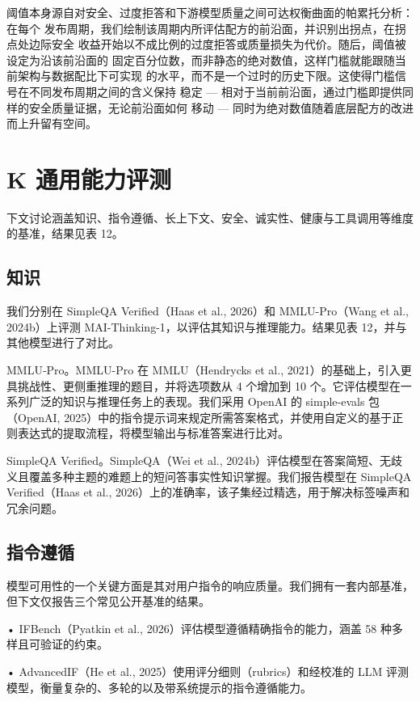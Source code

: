 \documentclass[
  10
]{article}
\begin{document}
阈值本身源自对安全、过度拒答和下游模型质量之间可达权衡曲面的帕累托分析：在每个
发布周期，我们绘制该周期内所评估配方的前沿面，并识别出拐点，在拐点处边际安全
收益开始以不成比例的过度拒答或质量损失为代价。随后，阈值被设定为沿该前沿面的
固定百分位数，而非静态的绝对数值，这样门槛就能跟随当前架构与数据配比下可实现
的水平，而不是一个过时的历史下限。这使得门槛信号在不同发布周期之间的含义保持
稳定 --- 相对于当前前沿面，通过门槛即提供同样的安全质量证据，无论前沿面如何
移动 --- 同时为绝对数值随着底层配方的改进而上升留有空间。

\section{K 通用能力评测}\label{k-general-capabilities-evaluations}

下文讨论涵盖知识、指令遵循、长上下文、安全、诚实性、健康与工具调用等维度的基准，结果见表 12。

\subsection{知识}\label{k.1-knowledge}

我们分别在 SimpleQA Verified（Haas et al., 2026）和 MMLU-Pro（Wang et al., 2024b）上评测 MAI-Thinking-1，以评估其知识与推理能力。结果见表 12，并与其他模型进行了对比。

MMLU‐Pro。MMLU-Pro 在 MMLU（Hendrycks et al., 2021）的基础上，引入更具挑战性、更侧重推理的题目，并将选项数从 4 个增加到 10 个。它评估模型在一系列广泛的知识与推理任务上的表现。我们采用 OpenAI 的 simple-evals 包（OpenAI, 2025）中的指令提示词来规定所需答案格式，并使用自定义的基于正则表达式的提取流程，将模型输出与标准答案进行比对。

SimpleQA Verified。SimpleQA（Wei et al., 2024b）评估模型在答案简短、无歧义且覆盖多种主题的难题上的短问答事实性知识掌握。我们报告模型在 SimpleQA Verified（Haas et al., 2026）上的准确率，该子集经过精选，用于解决标签噪声和冗余问题。

\subsection{指令遵循}\label{k.2-instruction-following}

模型可用性的一个关键方面是其对用户指令的响应质量。我们拥有一套内部基准，但下文仅报告三个常见公开基准的结果。

• IFBench（Pyatkin et al., 2026）评估模型遵循精确指令的能力，涵盖 58 种多样且可验证的约束。

• AdvancedIF（He et al., 2025）使用评分细则（rubrics）和经校准的 LLM 评测模型，衡量复杂的、多轮的以及带系统提示的指令遵循能力。
\end{document}
